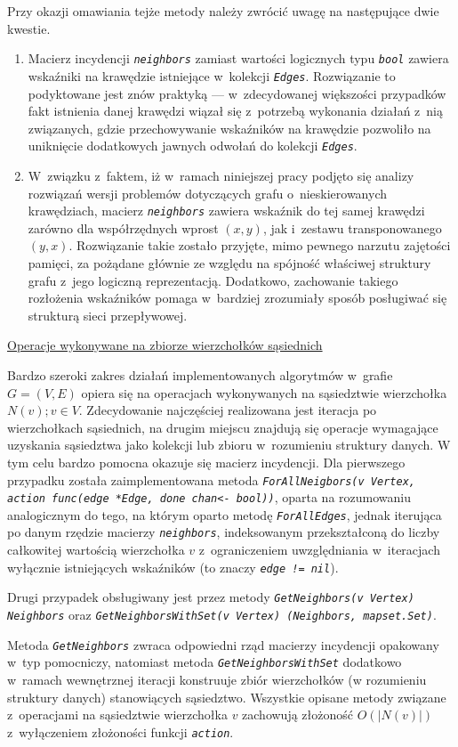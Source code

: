 {{      Przy okazji omawiania tejże metody należy zwrócić uwagę na następujące dwie kwestie.
      \begin{enumerate}
        \item Macierz incydencji \textit{\lstinline{neighbors}} zamiast wartości logicznych typu \textit{\lstinline{bool}} zawiera wskaźniki na krawędzie istniejące w~kolekcji \textit{\lstinline{Edges}}.
        Rozwiązanie to podyktowane jest znów praktyką --- w~zdecydowanej większości przypadków fakt istnienia danej krawędzi wiązał się z~potrzebą wykonania działań z~nią związanych, gdzie przechowywanie wskaźników na krawędzie pozwoliło na uniknięcie dodatkowych jawnych odwołań do kolekcji \textit{\lstinline{Edges}}.
        \item W~związku z~faktem, iż w~ramach niniejszej pracy podjęto się analizy rozwiązań wersji problemów dotyczących grafu o~nieskierowanych krawędziach, macierz \textit{\lstinline{neighbors}} zawiera wskaźnik do tej samej krawędzi zarówno dla współrzędnych wprost $(x, y)$, jak i~zestawu transponowanego $(y, x)$.
        Rozwiązanie takie zostało przyjęte, mimo pewnego narzutu zajętości pamięci, za pożądane głównie ze względu na spójność właściwej struktury grafu z~jego logiczną reprezentacją.
        Dodatkowo, zachowanie takiego rozłożenia wskaźników pomaga w~bardziej zrozumiały sposób posługiwać się strukturą sieci przepływowej.
      \end{enumerate}
  }
  \underline{Operacje wykonywane na zbiorze wierzchołków sąsiednich}\\
  \par{
    Bardzo szeroki zakres działań implementowanych algorytmów w~grafie $G=(V,E)$ opiera się na operacjach wykonywanych na sąsiedztwie wierzchołka $N(v); v \in V$.
    Zdecydowanie najczęściej realizowana jest iteracja po wierzchołkach sąsiednich, na drugim miejscu znajdują się operacje wymagające uzyskania sąsiedztwa jako kolekcji lub zbioru w~rozumieniu struktury danych.
    W tym celu bardzo pomocna okazuje się macierz incydencji.
    Dla pierwszego przypadku została zaimplementowana metoda \textit{\lstinline{ForAllNeigbors(v Vertex, action func(edge *Edge, done chan<- bool))}}, oparta na rozumowaniu analogicznym do tego, na którym oparto metodę \textit{\lstinline{ForAllEdges}}, jednak iterująca po danym rzędzie macierzy \textit{\lstinline{neighbors}}, indeksowanym przekształconą do liczby całkowitej wartością wierzchołka $v$ z~ograniczeniem uwzględniania w~iteracjach wyłącznie istniejących wskaźników (to znaczy \textit{\lstinline{edge != nil}}).

    Drugi przypadek obsługiwany jest przez metody \textit{\lstinline{GetNeighbors(v Vertex) Neighbors}} oraz \textit{\lstinline{GetNeighborsWithSet(v Vertex) (Neighbors, mapset.Set)}}.

    Metoda \textit{\lstinline{GetNeighbors}} zwraca odpowiedni rząd macierzy incydencji opakowany w~typ pomocniczy, natomiast metoda \textit{\lstinline{GetNeighborsWithSet}} dodatkowo w~ramach wewnętrznej iteracji konstruuje zbiór wierzchołków (w rozumieniu struktury danych) stanowiących sąsiedztwo.
    Wszystkie opisane metody związane z~operacjami na sąsiedztwie wierzchołka $v$ zachowują złożoność $O(|N(v)|)$ z~wyłączeniem złożoności funkcji \textit{\lstinline{action}}.
  }
}
